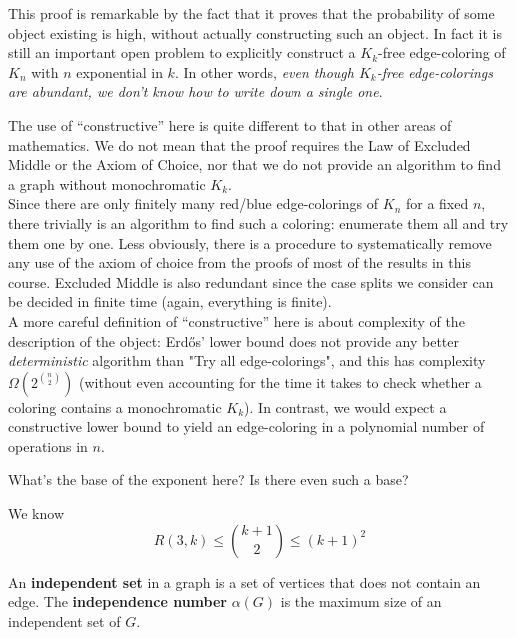 \documentclass{article}
\begin{document}
This proof is remarkable by the fact that it proves that the probability of some object existing is high, without actually constructing such an object. In fact it is still an important open problem to explicitly construct a $K_k$-free edge-coloring of $K_n$ with $n$ exponential in $k$. In other words, {\it even though $K_k$-free edge-colorings are abundant, we don't know how to write down a single one}.

\begin{rmk}
  The use of ``constructive'' here is quite different to that in other areas of mathematics. We do not mean that the proof requires the Law of Excluded Middle or the Axiom of Choice, nor that we do not provide an algorithm to find a graph without monochromatic $K_k$. \\
  Since there are only finitely many red/blue edge-colorings of $K_n$ for a fixed $n$, there trivially is an algorithm to find such a coloring: enumerate them all and try them one by one. Less obviously, there is a procedure to systematically remove any use of the axiom of choice from the proofs of most of the results in this course. Excluded Middle is also redundant since the case splits we consider can be decided in finite time (again, everything is finite). \\
  A more careful definition of ``constructive'' here is about complexity of the description of the object: Erd\H os' lower bound does not provide any better {\it deterministic} algorithm than "Try all edge-colorings", and this has complexity $\Omega\left(2^{\binom n 2}\right)$ (without even accounting for the time it takes to check whether a coloring contains a monochromatic $K_k$). In contrast, we would expect a constructive lower bound to yield an edge-coloring in a polynomial number of operations in $n$.
\end{rmk}

\begin{question}
  What's the base of the exponent here? Is there even such a base?
\end{question}

\newlec

We know
$$R(3, k) \le \binom{k + 1}2 \le (k + 1)^2$$

\begin{dfn}
  An {\bf independent set} in a graph is a set of vertices that does not contain an edge. The {\bf independence number} $\alpha(G)$ is the maximum size of an independent set of $G$.
\end{dfn}
\end{document}
